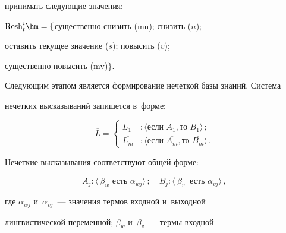 принимать сле\-ду\-ющие значения: 


$\mathrm{Resh}_t^i\hm= \{$су\-ще\-ст\-вен\-но снизить ($\mathrm{mn}$); {снизить} ($n$); 


{оставить текущее значение} ($s$); {повысить} ($v$); 


существенно повысить ($\mathrm{mv}$)$\}$.





  Следующим этапом является формирование нечеткой базы знаний. Сис\-те\-ма 


нечетких высказываний запишется в~форме:


  \begin{equation*}


  \overline{L} =\begin{cases}


  \overline{L_1} & :\langle \mbox{если } \overline{A_1}, \mbox{то } 


\overline{B_1}\rangle\,;\\


  \overline{L_m} & :\langle \mbox{если } \overline{A_m}, \mbox{то } 


\overline{B_m}\rangle\,.


  \end{cases} 




  \end{equation*}


  





  


  Нечеткие высказывания соответствуют общей форме:


    \begin{equation*}


  \overline{A_j} :\langle\ \beta_w \mbox{ есть } \alpha_{wj}\rangle\,;\quad


\overline{B_j} :\langle\ \beta_v\ \mbox{ есть } \alpha_{vj}\rangle\,,




  \end{equation*}


  


  \noindent


где $\alpha_{wj}$ и~$\alpha_{vj}$~--- значения термов входной и~выходной 


лингвистической переменной; $\beta_w$ и~$\beta_v$~--- термы входной 


